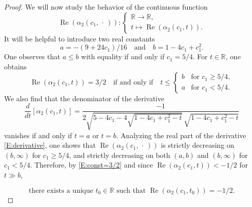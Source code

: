 \documentclass[reqno,11pt,centertags]{amsart}
\newcommand{\bbR}{{\mathbb{R}}}
\newcommand{\<}{\langle}
\renewcommand{\>}{\rangle}
\newcommand{\lb}{\label}
\renewcommand{\Re}{\operatorname{Re}}
\numberwithin{equation}{section}
\theoremstyle{definition}
\begin{document}
\begin{proof}
We will now study the behavior of the continuous function
\begin{equation}
\Re(\alpha_2(c_1,\,\cdot \,)): \begin{cases} \bbR\to \bbR, \\
t\mapsto \Re(\alpha_2(c_1,t )).
\end{cases} 
\end{equation}
It will be helpful to introduce two  real constants
\begin{equation}
a=- (9 + 24 c_1)/16 \quad \mbox{and} \quad b=1-4c_1+c_1^2 .
\end{equation}
One observes that  $a\leq  b$ with equality if and only if $c_1=5/4$.
For $t\in \bbR$,  one obtains 
\begin{equation}\lb{E:const=3/2}
\Re(\alpha_2(c_1,t )) = 3/2  
\quad \mbox{if and only if}\quad  t \leq 
\begin{cases}
b  & \mbox{for $c_1 \geq   5/4$},\\ 
a & \mbox{for $c_1 < 5/4$}.
\end{cases}
\end{equation}
We also find that the denominator of the derivative 
\begin{equation}\lb{E:derivative}
\frac{d}{dt}[ \alpha_2(c_1,t)]=\frac{-1}{2 \sqrt{5-4c_1-4 \sqrt{1-4c_1+c_1^2-t}}\, \sqrt{1-4c_1+c_1^2-t}}
\end{equation}
vanishes if and only if  $t=a$ or  $t=b$. 
Analyzing the real part of the derivative  \eqref{E:derivative}, one shows that $\Re(\alpha_2(c_1,\,\cdot \,))$ is strictly decreasing on $(b,\infty)$ for $c_1 \geq   5/4$,
and strictly decreasing on both $(a,b)$ and $(b,\infty)$ for $c_1<   5/4$.
Therefore, by \eqref{E:const=3/2} and since $\Re(\alpha_2(c_1,t )) < -1/2$ for $t \gg b$, 

\begin{equation}\label{E:t0}
\mbox{there exists a unique $t_0\in \bbR$ such that  
$\Re(\alpha_2(c_1,t_0)) = -1/2$.}
\end{equation}


\end{proof}
\end{document}
